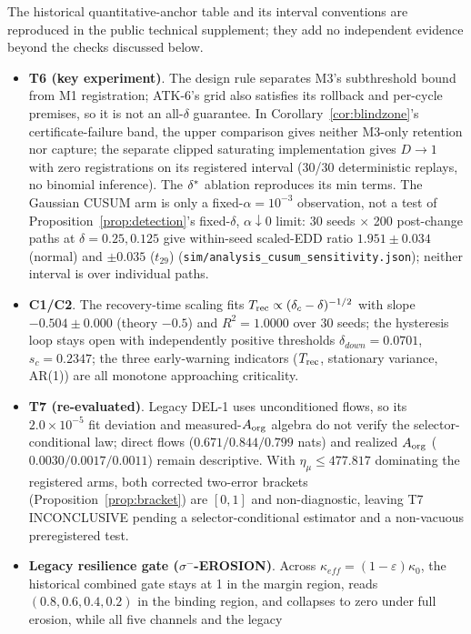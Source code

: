 The historical quantitative-anchor table and its interval conventions are
reproduced in the public technical supplement; they add no independent evidence
beyond the checks discussed below.

\begin{itemize}
\item \textbf{T6 (key experiment)}. The design rule separates M3's
subthreshold bound from M1 registration; ATK-6's grid also satisfies its
rollback and per-cycle premises, so it is not an all-$\delta$ guarantee. In
Corollary~\ref{cor:blindzone}'s certificate-failure band, the upper comparison
gives neither M3-only retention nor capture; the separate clipped saturating
implementation gives $D\to1$ with zero registrations on its registered
interval (30/30 deterministic replays, no binomial inference). The
$\delta^{*}$ ablation reproduces its min terms. The Gaussian CUSUM arm is only
a fixed-$\alpha=10^{-3}$ observation, not a test of
Proposition~\ref{prop:detection}'s fixed-$\delta$, $\alpha\downarrow0$ limit:
30 seeds $\times$ 200 post-change paths at $\delta=0.25,0.125$ give within-seed
scaled-EDD ratio $1.951\pm0.034$ (normal) and $\pm0.035$ ($t_{29}$)
(\texttt{sim/analysis\_cusum\_sensitivity.json}); neither interval is over
individual paths.
\item \textbf{C1/C2}. The recovery-time scaling fits
$T_{\mathrm{rec}}\propto(\delta_c-\delta)^{-1/2}$ with slope $-0.504\pm0.000$
(theory $-0.5$) and $R^2=1.0000$ over 30 seeds; the hysteresis loop stays open
with independently positive thresholds $\delta_{down}=0.0701$,
$s_c=0.2347$; the three early-warning indicators ($T_{\mathrm{rec}}$, stationary
variance, AR(1)) are all monotone approaching criticality.
\item \textbf{T7 (re-evaluated)}. Legacy DEL-1 uses unconditioned flows, so
its $2.0\times10^{-5}$ fit deviation and measured-$A_{\mathrm{org}}$ algebra do not verify
the selector-conditional law; direct flows ($0.671/0.844/0.799$ nats) and
realized $A_{\mathrm{org}}$ ($0.0030/0.0017/0.0011$) remain descriptive. With
$\eta_\mu\le477.817$ dominating the registered arms, both corrected
two-error brackets (Proposition~\ref{prop:bracket}) are $[0,1]$ and
non-diagnostic, leaving T7 INCONCLUSIVE pending a selector-conditional
estimator and a non-vacuous preregistered test.
\item \textbf{Legacy resilience gate ($\sigma^-$-EROSION)}. Across
$\kappa_{eff}=(1-\varepsilon)\kappa_0$, the historical combined gate stays at
1 in the margin region, reads $(0.8,0.6,0.4,0.2)$ in the binding region, and
collapses to zero under full erosion, while all five channels and the legacy

\end{itemize}
